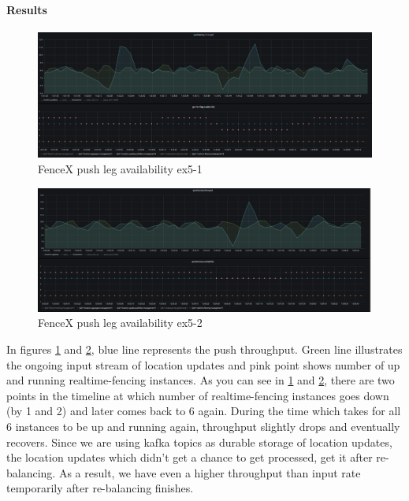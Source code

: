 \documentclass[a4]{report}
\begin{document}
    \paragraph{Results}
    \begin{figure}[ht]
        \caption{FenceX push leg availability ex5-1}
        \label{fig:ex5-1}
        \includegraphics[scale=0.4]{images/evaluation/ex5-benchmarking-ongoing-2per7sec.png}
    \end{figure}

    \begin{figure}[ht]
        \caption{FenceX push leg availability ex5-2}
        \label{fig:ex5-2}
        \includegraphics[scale=0.4]{images/evaluation/ex5-benchmarking-ongoing-2per6sec.png}
    \end{figure}

    In figures \ref{fig:ex5-1} and \ref{fig:ex5-2}, blue line represents the push throughput.
    Green line illustrates the ongoing input stream of location updates and pink point shows
    number of up and running realtime-fencing instances.
    As you can see in \ref{fig:ex5-1} and \ref{fig:ex5-2}, there are two points in the timeline at which number of
    realtime-fencing
    instances goes down (by 1 and 2) and later comes back to 6 again.
    During the time which takes for all 6 instances to be up and running again, throughput slightly drops and
    eventually recovers.
    Since we are using kafka topics as durable storage of location updates, the location updates which
    didn't get a chance to get processed, get it after re-balancing.
    As a result, we have even a higher throughput than input rate temporarily after re-balancing finishes.
\end{document}

